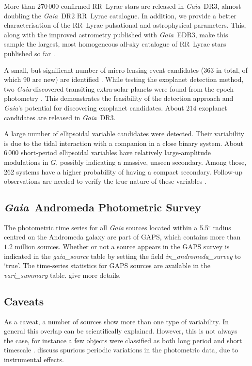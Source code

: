 \documentclass[longauth]{aa}
\makeatletter
\def\deg{\ensuremath{^\circ}}
\providecommand\gmag{\ensuremath{G}\xspace}
\newcommand\gaia{\textit{Gaia}\xspace}
\providecommand\gdrtwo{\textit{Gaia}~DR2\xspace}
\providecommand\gedrthree{\textit{Gaia}~EDR3\xspace}
\providecommand\gdrthree{\textit{Gaia}~DR3\xspace}
\providecommand{\linktodoc}{https://gea.esac.esa.int/archive/documentation/GDR3}
\providecommand{\gstable}[1]{\url{\linktodoc/Gaia_archive/chap_datamodel/sec_dm_main_source_catalogue/ssec_dm_#1.html}}%
\DeclareRobustCommand*{\fieldName}[1]{%
  \begingroup\@fieldName\scantokens{\texttt{\small {#1}}\noexpand}\endgroup}
\newcommand{\gdrthreevarimulens}{\ensuremath{363}\xspace}
\newcommand{\gdrthreevariplanets}{\ensuremath{214}\xspace}
\makeatother
\begin{document}
More than 270\,000 confirmed RR~Lyrae stars are released in \gdrthree,  almost
doubling the \gdrtwo RR~Lyrae catalogue.  In addition, we provide  a better characterisation of the RR~Lyrae pulsational and astrophysical parameters. This, along with the improved astrometry published with \gedrthree, make this sample the largest, most homogeneous all-sky catalogue of  RR~Lyrae stars published so far \citep{DR3-DPACP-168}.  

A small, but significant number of micro-lensing event candidates (\gdrthreevarimulens in total, of which 90 are new) are identified \citep{DR3-DPACP-166}. While testing the exoplanet detection method, two \gaia-discovered  transiting extra-solar planets were found from the epoch photometry \citep{DR3-DPACP-181}. This demonstrates the feasibility of the detection approach and \gaia's potential for discovering exoplanet candidates.  About \gdrthreevariplanets exoplanet candidates  are  released in \gdrthree.

A large number of ellipsoidal
variable candidates were detected. Their  variability is due to the tidal interaction with a companion in a close binary system. About 6\,000 short-period ellipsoidal variables have relatively large-amplitude modulations in \gmag, possibly indicating a  massive, unseen secondary. Among those, 262 systems have a higher probability of having a compact secondary. Follow-up observations are needed to verify the true nature of these variables \citep{DR3-DPACP-174}.

\subsection{\gaia\ Andromeda Photometric Survey}

The photometric time series for all \gaia sources  located within a 5.5$\deg$ radius  centred on the Andromeda galaxy are part of GAPS, which contains more than $1.2$ million sources. Whether or not  a source appears in the GAPS survey is indicated in the \textit{gaia\_source} table by setting the field \textit{in\_andromeda\_survey} %
to `true'. The time-series statistics for GAPS sources are available in the \textit{vari\_summary} table. \citet{DR3-DPACP-142} give more details.

\subsection{Caveats}

As a caveat, a number of sources show more than one type of variability. In general this overlap can be scientifically explained. However, this is not always the case, for instance a few objects were classified as both long period and  short timescale  \citep{DR3-DPACP-171}.  
\cite{DR3-DPACP-164} discuss spurious  periodic variations in the photometric data, due to instrumental effects.
\end{document}
